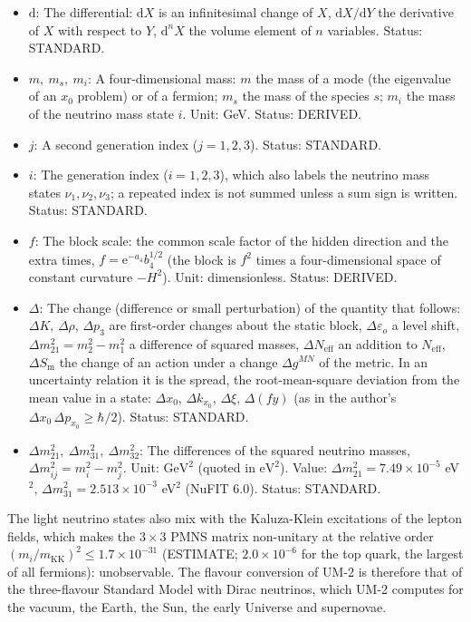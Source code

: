 \documentclass[
  10pt,
]{article}
\providecommand{\tightlist}{%
  \setlength{\itemsep}{0pt}\setlength{\parskip}{0pt}}
\begin{document}
\begin{itemize}
\tightlist
\item
  \(\mathrm{d}\): The differential: \(\mathrm{d}X\) is an infinitesimal
  change of \(X\), \(\mathrm{d}X/\mathrm{d}Y\) the derivative of \(X\)
  with respect to \(Y\), \(\mathrm{d}^nX\) the volume element of \(n\)
  variables. Status: STANDARD.
\item
  \(m,\ m_s,\ m_i\): A four-dimensional mass: \(m\) the mass of a mode
  (the eigenvalue of an \(x_0\) problem) or of a fermion; \(m_s\) the
  mass of the species \(s\); \(m_i\) the mass of the neutrino mass state
  \(i\). Unit: GeV. Status: DERIVED.
\item
  \(j\): A second generation index (\(j = 1, 2, 3\)). Status: STANDARD.
\item
  \(i\): The generation index (\(i = 1, 2, 3\)), which also labels the
  neutrino mass states \(\nu_1, \nu_2, \nu_3\); a repeated index is not
  summed unless a sum sign is written. Status: STANDARD.
\item
  \(f\): The block scale: the common scale factor of the hidden
  direction and the extra times, \(f = \mathrm{e}^{-a_4}b_4^{1/2}\) (the
  block is \(f^2\) times a four-dimensional space of constant curvature
  \(-H^2\)). Unit: dimensionless. Status: DERIVED.
\item
  \(\Delta\): The change (difference or small perturbation) of the
  quantity that follows: \(\Delta K\), \(\Delta\rho\), \(\Delta p_3\)
  are first-order changes about the static block,
  \(\Delta\varepsilon_o\) a level shift,
  \(\Delta m^2_{21} = m_2^2 - m_1^2\) a difference of squared masses,
  \(\Delta N_{\mathrm{eff}}\) an addition to \(N_{\mathrm{eff}}\),
  \(\Delta S_{\mathrm{m}}\) the change of an action under a change
  \(\Delta g^{MN}\) of the metric. In an uncertainty relation it is the
  spread, the root-mean-square deviation from the mean value in a state:
  \(\Delta x_0\), \(\Delta k_{x_0}\), \(\Delta\xi\), \(\Delta(fy)\) (as
  in the author's \(\Delta x_0\,\Delta p_{x_0} \ge \hbar/2\)). Status:
  STANDARD.
\item
  \(\Delta m_{21}^2,\ \Delta m_{31}^2,\ \Delta m_{32}^2\): The
  differences of the squared neutrino masses,
  \(\Delta m_{ij}^2 = m_i^2 - m_j^2\). Unit: \(\mathrm{GeV}^{2}\)
  (quoted in \(\mathrm{eV}^{2}\)). Value:
  \(\Delta m_{21}^2 = 7.49\times10^{-5}\) eV\(^2\),
  \(\Delta m_{31}^2 = 2.513\times10^{-3}\) eV\(^2\) (NuFIT 6.0). Status:
  STANDARD.
\end{itemize}

The light neutrino states also mix with the Kaluza-Klein excitations of
the lepton fields, which makes the \(3\times3\) PMNS matrix non-unitary
at the relative order \((m_i/m_{\mathrm{KK}})^2 \le 1.7\times10^{-31}\)
(ESTIMATE; \(2.0\times10^{-6}\) for the top quark, the largest of all
fermions): unobservable. The flavour conversion of UM-2 is therefore
that of the three-flavour Standard Model with Dirac neutrinos, which
UM-2 computes for the vacuum, the Earth, the Sun, the early Universe and
supernovae.
\end{document}

